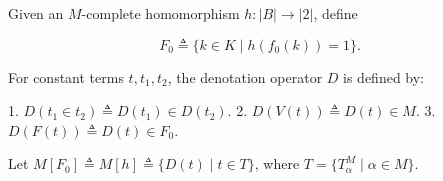 Given an $M$-complete homomorphism $h: |B| \to |2|$, define

$$
F_0 \triangleq \{k \in K \mid h(f_0(k)) = 1\}.
$$

For constant terms $t, t_1, t_2$, the denotation operator $D$ is defined by:

1. $D(t_1 \in t_2) \triangleq D(t_1) \in D(t_2)$.
2. $D(V(t)) \triangleq D(t) \in M$.
3. $D(F(t)) \triangleq D(t) \in F_0$.

Let $M[F_0] \triangleq M[h] \triangleq \{D(t) \mid t \in T\}$, where $T = \{T_{\alpha}^M \mid \alpha \in M\}$.
